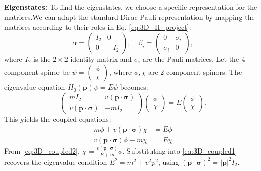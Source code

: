 \documentclass[11pt]{article}
\begin{document}
\textbf{Eigenstates:}
To find the eigenstates, we choose a specific representation for the matrices.We can adapt the standard Dirac-Pauli representation by mapping the matrices according to their roles in Eq. \eqref{eq:3D_H_project}:
\[ \alpha = \begin{pmatrix} I_2 & 0 \\ 0 & -I_2 \end{pmatrix}, \quad \beta_i = \begin{pmatrix} 0 & \sigma_i \\ \sigma_i & 0 \end{pmatrix}, \]
where $I_2$ is the $2 \times 2$ identity matrix and $\sigma_i$ are the Pauli matrices. Let the 4-component spinor be $\psi = \begin{pmatrix} \phi \\ \chi \end{pmatrix}$, where $\phi, \chi$ are 2-component spinors. The eigenvalue equation $H_0(\mathbf{p}) \psi = E \psi$ becomes:
\[ \begin{pmatrix} m I_2 & v (\mathbf{p} \cdot \bm{\sigma}) \\ v (\mathbf{p} \cdot \bm{\sigma}) & -m I_2 \end{pmatrix} \begin{pmatrix} \phi \\ \chi \end{pmatrix} = E \begin{pmatrix} \phi \\ \chi \end{pmatrix}. \]
This yields the coupled equations:
\begin{align} m \phi + v (\mathbf{p} \cdot \bm{\sigma}) \chi &= E \phi \label{eq:3D_coupled1} \\ v (\mathbf{p} \cdot \bm{\sigma}) \phi - m \chi &= E \chi \label{eq:3D_coupled2} \end{align}
From \eqref{eq:3D_coupled2}, $\chi = \frac{v (\mathbf{p} \cdot \bm{\sigma})}{E + m} \phi$. Substituting into \eqref{eq:3D_coupled1} recovers the eigenvalue condition $E^2 = m^2 + v^2 p^2$, using $(\mathbf{p} \cdot \bm{\sigma})^2 = |\mathbf{p}|^2 I_2$.
\end{document}
